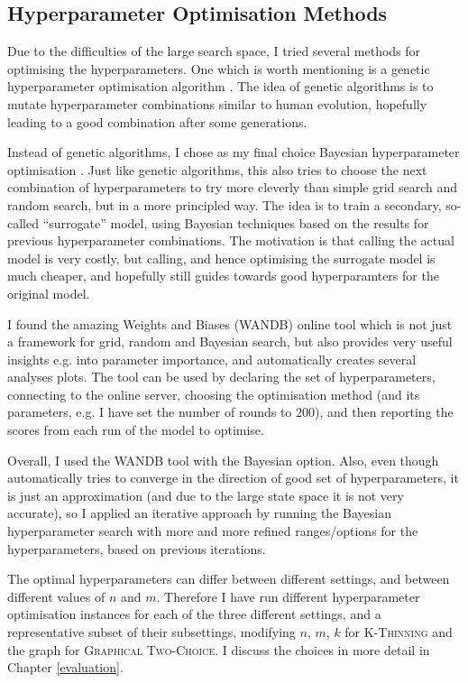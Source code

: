 \subsection{Hyperparameter Optimisation Methods}

Due to the difficulties of the large search space, I tried several methods for optimising the hyperparameters. One which is worth mentioning is a genetic hyperparameter optimisation algorithm \cite{wicaksono2018genetichyper}. The idea of genetic algorithms is to mutate hyperparameter combinations similar to human evolution, hopefully leading to a good combination after some generations.


Instead of genetic algorithms, I chose as my final choice Bayesian hyperparameter optimisation \cite{eggensperger2013bayesianhyper}. Just like genetic algorithms, this also tries to choose the next combination of hyperparameters to try more cleverly than simple grid search and random search, but in a more principled way. The idea is to train a secondary, so-called ``surrogate'' model, using Bayesian techniques based on the results for previous hyperparameter combinations. The motivation is that calling the actual model is very costly, but calling, and hence optimising the surrogate model is much cheaper, and hopefully still guides towards good hyperparamters for the original model.


I found the amazing Weights and Biases (WANDB) online tool \cite{biewald2020wandb} which is not just a framework for grid, random and Bayesian search, but also provides very useful insights e.g. into parameter importance, and automatically creates several analyses plots. The tool can be used by declaring the set of hyperparameters, connecting to the online server, choosing the optimisation method (and its parameters, e.g. I have set the number of rounds to $200$), and then reporting the scores from each run of the model to optimise.


Overall, I used the WANDB tool with the Bayesian option. Also, even though automatically tries to converge in the direction of good set of hyperparameters, it is just an approximation (and due to the large state space it is not very accurate), so I applied an iterative approach by running the Bayesian hyperparameter search with more and more refined ranges/options for the hyperparameters, based on previous iterations.


The optimal hyperparameters can differ between different settings, and between different values of $n$ and $m$. Therefore I have run different hyperparameter optimisation instances for each of the three different settings, and a representative subset of their subsettings, modifying $n$, $m$, $k$ for \textsc{K-Thinning} and the graph for \textsc{Graphical Two-Choice}. I discuss the choices in more detail in Chapter \ref{evaluation}.


